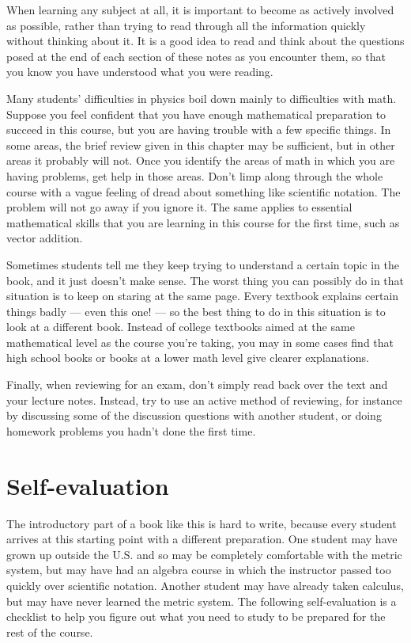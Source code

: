 When learning any subject at all, it is important to become
as actively involved as possible, rather than trying to read
through all the information quickly without thinking about
it. It is a good idea to read and think about the questions
posed at the end of each section of these notes as you
encounter them, so that you know you have understood
what you were reading.

Many students' difficulties in physics boil down mainly to
difficulties with math. Suppose you feel confident that you
have enough mathematical preparation to succeed in this
course, but you are having trouble with a few specific
things. In some areas, the brief review given in this
chapter may be sufficient, but in other areas it probably
will not. Once you identify the areas of math in which you
are having problems, get help in those areas. Don't limp
along through the whole course with a vague feeling of dread
about something like scientific notation. The problem will
not go away if you ignore it. The same applies to essential
mathematical skills that you are learning in this course for
the first time, such as vector addition.

Sometimes students tell me they keep trying to understand a
certain topic in the book, and it just doesn't make sense.
The worst thing you can possibly do in that situation is to
keep on staring at the same page. Every textbook explains
certain things badly --- even this one! --- so the best thing to
do in this situation is to look at a different book. Instead
of college textbooks aimed at the same mathematical level as
the course you're taking, you may in some cases find that
high school books or books at a lower math level give
clearer explanations.

 Finally, when reviewing for an exam, don't simply read back
over the text and your lecture notes. Instead, try to use an
active method of reviewing, for instance by discussing some
of the discussion questions with another student, or doing
homework problems you hadn't done the first time.


\section{Self-evaluation}


The introductory part of a book like this is hard to write,
because every student arrives at this starting point with a
different preparation. One student may have grown up
outside the U.S. and so may be completely comfortable with
the metric system, but may have had an algebra course in
which the instructor passed too quickly over scientific
notation. Another student may have already taken  calculus,
but may have never learned the metric system. The following
self-evaluation is a checklist to help you figure out what
you need to study to be prepared for the rest of the course.

